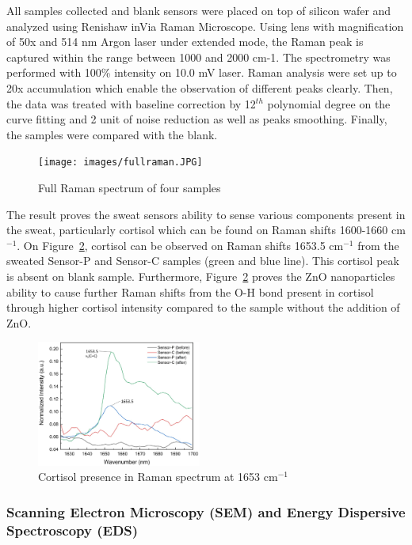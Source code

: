 \documentclass[journal]{IEEEtran}
\begin{document}
All samples collected and blank sensors were placed on top of silicon wafer and analyzed using Renishaw inVia Raman Microscope. Using lens with magnification of 50x and 514 nm Argon laser under extended mode, the Raman peak is captured within the range between 1000 and 2000 cm-1. The spectrometry was performed with 100\% intensity on 10.0 mV laser. Raman analysis were set up to 20x accumulation which enable the observation of different peaks clearly. Then, the data was treated with baseline correction by 12$^{th}$  polynomial degree on the curve fitting and 2 unit of noise reduction as well as peaks smoothing. Finally, the samples were compared with the blank.

\begin{figure}[H]
\centering
\texttt{[image: images/fullraman.JPG]}
\caption{Full Raman spectrum of four samples} \label{fig:full_raman}
\end{figure}

The result proves the sweat sensors ability to sense various components present in the sweat, particularly cortisol which can be found on Raman shifts 1600-1660 cm$^{-1}$. On Figure~\ref{fig:cortisol_raman}, cortisol can be observed on Raman shifts 1653.5 cm$^{-1}$ from the sweated Sensor-P and Sensor-C samples (green and blue line). This cortisol peak is absent on blank sample. Furthermore, Figure~\ref{fig:cortisol_raman} proves the ZnO nanoparticles ability to cause further Raman shifts from the O-H bond present in cortisol through higher cortisol intensity compared to the sample without the addition of ZnO. 

\begin{figure}[H]
\begin{center}
\includegraphics[width=0.48\textwidth]{images/raman_c.PNG}
\caption{Cortisol presence in Raman spectrum at 1653 cm$^{-1}$} \label{fig:cortisol_raman}
\end{center}
\end{figure}

\subsubsection{Scanning Electron Microscopy (SEM) and Energy Dispersive Spectroscopy (EDS)}
\end{document}
